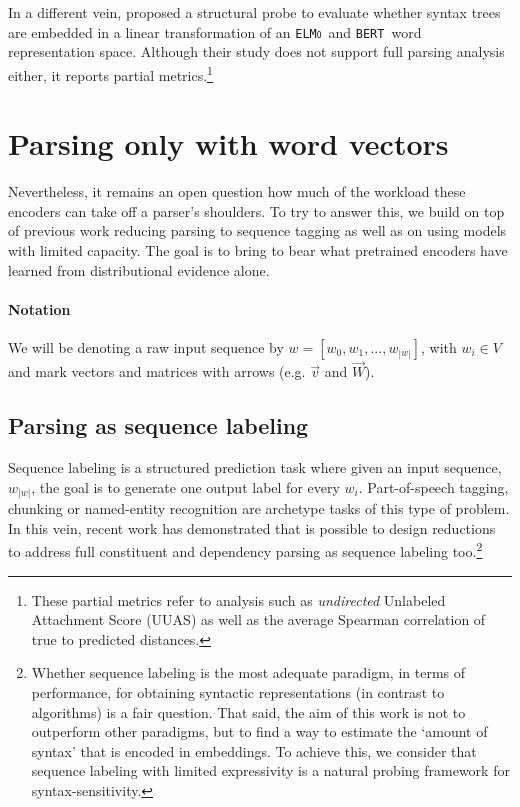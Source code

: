 \documentclass[letterpaper]{article} %
\newcommand{\citet}[1]{\citeauthor{#1} \shortcite{#1}}
\newcommand{\elmo}{\texttt{\textsc{ELMo}}}
\newcommand{\bert}{\texttt{\textsc{BERT}}}
\begin{document}
In a different vein, \citet{hewitt2019structural} proposed a structural probe to evaluate whether syntax trees are embedded in a linear transformation of an \elmo\ and \bert\ word representation space. Although their study does not support full parsing analysis either, it reports partial metrics.\footnote{These partial metrics refer to analysis such as \emph{undirected} Unlabeled Attachment Score (UUAS) as well as the average Spearman correlation of true to predicted distances.}


\section{Parsing only with word vectors}

Nevertheless, it remains an open question how much of the workload these encoders can take off a parser's shoulders. To try to answer this, we build on top of previous work reducing parsing to sequence tagging as well as on using models with limited capacity. The goal is to bring to bear what pretrained encoders have learned from distributional evidence alone.

\paragraph{Notation} We will be denoting a raw input sequence by $w=[w_0,w_1,...,w_{|w|}]$, with $w_i \in V$ and mark vectors and matrices with arrows (e.g. $\vec{v}$ and $\vec{W}$).

\subsection{Parsing as sequence labeling}

Sequence labeling is a structured prediction task where given an input sequence, $w_{|w|}$, the goal is to generate one output label for every $w_i$. Part-of-speech tagging, chunking or named-entity recognition are archetype tasks of this type of problem. In this vein, recent work has demonstrated that is possible to design reductions to address full constituent and dependency parsing as sequence labeling too.\footnote{Whether sequence labeling is the most adequate paradigm, in terms of performance, for obtaining syntactic representations (in contrast to algorithms) is a fair question. That said, the aim of this work is not to outperform other paradigms, but to find a way
to estimate the `amount of syntax' that is encoded in embeddings. To achieve this, we consider that sequence labeling with limited expressivity is a natural probing framework for syntax-sensitivity.}
\end{document}
